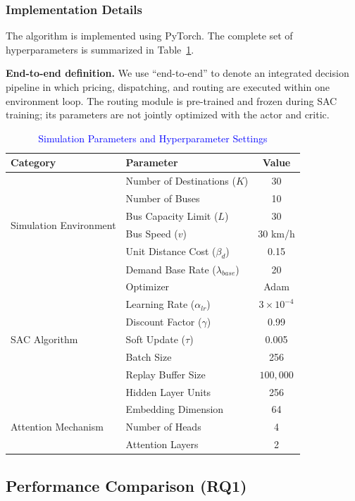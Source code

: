 \documentclass[lettersize,journal]{IEEEtran}
\begin{document}
\subsubsection{Implementation Details}
The algorithm is implemented using PyTorch. The complete set of hyperparameters is summarized in Table~\ref{tab:params}.

\textbf{End-to-end definition.} We use ``end-to-end'' to denote an integrated decision pipeline in which pricing, dispatching, and routing are executed within one environment loop. The routing module is pre-trained and frozen during SAC training; its parameters are not jointly optimized with the actor and critic.

\begin{table}[htbp]
\caption{\textcolor{blue}{Simulation Parameters and Hyperparameter Settings}}
\label{tab:params}
\centering
\color{blue}
\begin{tabular}{l|l|c}
\hline
\textbf{Category} & \textbf{Parameter} & \textbf{Value} \\
\hline
\multirow{6}{*}{Simulation Environment} 
 & Number of Destinations ($K$) & 30 \\
 & Number of Buses & 10 \\
 & Bus Capacity Limit ($L$) & 30 \\
 & Bus Speed ($v$) & 30 km/h \\
 & Unit Distance Cost ($\beta_d$) & 0.15 \\
 & Demand Base Rate ($\lambda_{base}$) & 20 \\
\hline
\multirow{7}{*}{SAC Algorithm} 
 & Optimizer & Adam \\
 & Learning Rate ($\alpha_{lr}$) & $3 \times 10^{-4}$ \\
 & Discount Factor ($\gamma$) & 0.99 \\
 & Soft Update ($\tau$) & 0.005 \\
 & Batch Size & 256 \\
 & Replay Buffer Size & $100,000$ \\
 & Hidden Layer Units & 256 \\
\hline
\multirow{3}{*}{Attention Mechanism} 
 & Embedding Dimension & 64 \\
 & Number of Heads & 4 \\
 & Attention Layers & 2 \\
\hline
\end{tabular}
\end{table}

\subsection{Performance Comparison (RQ1)}
\end{document}
